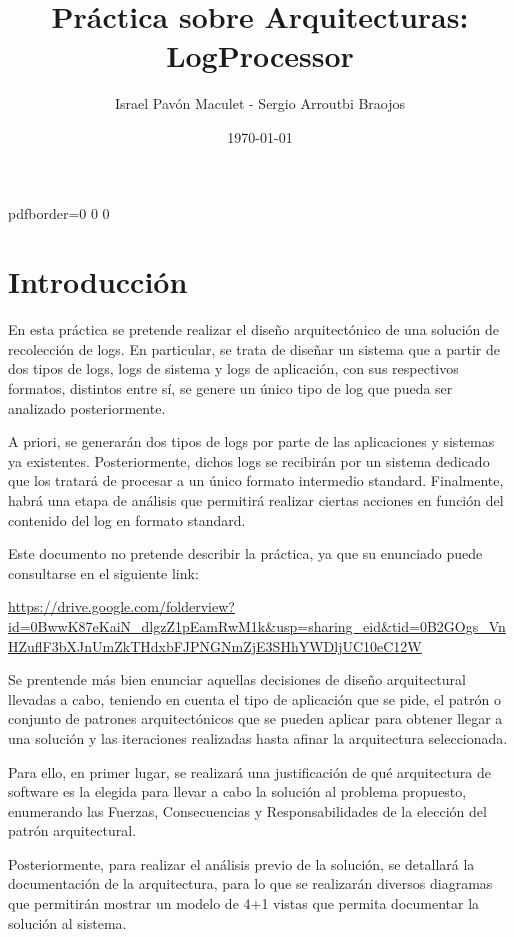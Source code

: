\documentclass[11pt]{article}
\title{\textbf{Práctica sobre Arquitecturas: LogProcessor}}
\author{Israel Pavón Maculet - Sergio Arroutbi Braojos}
\date{\today}
\begin{document}

\hypersetup
{   
pdfborder={0 0 0}
}
   
\maketitle

\pagebreak

\tableofcontents

\pagebreak

\section{Introducción}
En esta práctica se pretende realizar el diseño arquitectónico de una solución de recolección de logs. En particular, se trata de diseñar un sistema que a partir de dos tipos de logs, logs de sistema y logs de aplicación, con sus respectivos formatos, distintos entre sí, se genere un único tipo de log que pueda ser analizado posteriormente.

A priori, se generarán dos tipos de logs por parte de las aplicaciones y sistemas ya existentes. Posteriormente, dichos logs se recibirán por un sistema dedicado que los tratará de procesar a un único formato intermedio standard. Finalmente, habrá una etapa de análisis que permitirá realizar ciertas acciones en función del contenido del log en formato standard.

Este documento no pretende describir la práctica, ya que su enunciado puede consultarse en el siguiente link:

\url{https://drive.google.com/folderview?id=0BwwK87eKaiN_dlgzZ1pEamRwM1k&usp=sharing_eid&tid=0B2GOgs_VnHZuflF3bXJnUmZkTHdxbFJPNGNmZjE3SHhYWDljUC10eC12W}

Se prentende más bien enunciar aquellas decisiones de diseño arquitectural llevadas a cabo, teniendo en cuenta el tipo de aplicación que se pide, el patrón o conjunto de patrones arquitectónicos que se pueden aplicar para obtener llegar a una solución y las iteraciones realizadas hasta afinar la arquitectura seleccionada.

Para ello, en primer lugar, se realizará una justificación de qué arquitectura de software es la elegida para llevar a cabo la solución al problema propuesto, enumerando las Fuerzas, Consecuencias y Responsabilidades de la elección del patrón arquitectural.

Posteriormente, para realizar el análisis previo de la solución, se detallará la documentación de la arquitectura, para lo que se realizarán diversos diagramas que permitirán mostrar un modelo de 4+1 vistas que permita documentar la solución al sistema.
\end{document}
